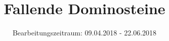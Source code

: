 \documentclass[11pt,a4paper]{scrartcl}
\title{Fallende Dominosteine}
\subtitle{Bearbeitungszeitraum: 09.04.2018 - 22.06.2018}
\date{}
\author{}
\begin{document}
	

    \nocite{*}
    \printbibliography
\end{document}
